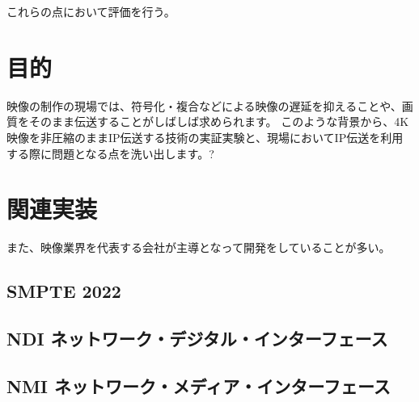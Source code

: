 これらの点において評価を行う。

\section{目的}

映像の制作の現場では、符号化・複合などによる映像の遅延を抑えることや、画質をそのまま伝送することがしばしば求められます。
このような背景から、4K映像を非圧縮のままIP伝送する技術の実証実験と、現場においてIP伝送を利用する際に問題となる点を洗い出します。?


\section{関連実装}
また、映像業界を代表する会社が主導となって開発をしていることが多い。

\subsection{SMPTE 2022}

\subsection{NDI ネットワーク・デジタル・インターフェース}

\subsection{NMI ネットワーク・メディア・インターフェース\cite{sony-nmi}}
